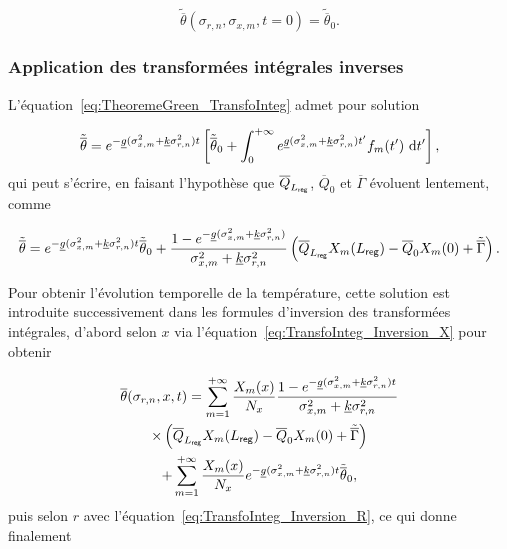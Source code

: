 \begin{equation}
	\tilde{\overline{\theta}}(\sigma_{r,n},\sigma_{x,m},t=0) = \tilde{\overline{\theta}}_0.
\end{equation}

\subsubsection{Application des transformées intégrales inverses}
L'équation~\ref{eq:TheoremeGreen_TransfoInteg} admet pour solution 

\begin{equation}
	\tilde{\overline{\theta}} = e^{-\underline{g}(\sigma_{x,m}^2+\underline{k}\sigma_{r,n}^2)t}\left[\tilde{\overline{\theta}}_0+\int_{0}^{+\infty}e^{\underline{g}(\sigma_{x,m}^2+\underline{k}\sigma_{r,n}^2)t'}f_m(t')\ \deriv t'\right],
	\label{eq:DoubleTransform_T}
\end{equation}
qui peut s'écrire, en faisant l'hypothèse que $\overline{Q}_{L_{\sf reg}}$, $\overline{Q}_{0}$ et $\overline{\Gamma}$ évoluent lentement, comme

\begin{equation}
	\tilde{\overline{\theta}} = e^{-\underline{g}(\sigma_{x,m}^2 + \underline{k}\sigma_{r,n}^2)t}\tilde{\overline{\theta}}_0 + \frac{1 - e^{-\underline{g}(\sigma_{x,m}^2 + \underline{k}\sigma_{r,n}^2)}}{\sigma_{x,m}^2 + \underline{k}\sigma_{r,n}^2}\left(\overline{Q}_{L_{\sf reg}}X_m(L_{\sf reg}) - \overline{Q}_{0}X_m(0) +\tilde{\overline{\Gamma}}\right).
	\label{eq:DoubleTransform_T_FaibleVariTempo_fm}
\end{equation}

Pour obtenir l'évolution temporelle de la température, cette solution est introduite successivement dans les formules d'inversion des transformées intégrales, d'abord selon $x$ via l'équation~\eqref{eq:TransfoInteg_Inversion_X} pour obtenir

\begin{multline}
	\overline{\theta}(\sigma_{r,n},x,t) = \sum_{m=1}^{+\infty} \frac{X_m(x)}{N_x}\frac{1-e^{-\underline{g}(\sigma_{x,m}^2+\underline{k}\sigma_{r,n}^2)t}}{\sigma_{x,m}^2+\underline{k}\sigma_{r,n}^2}\\
	\times \left(\overline{Q}_{L_{\sf reg}}X_m(L_{\sf reg}) - \overline{Q}_{0}X_m(0) +\tilde{\overline{\Gamma}}\right)\\
	+ \sum_{m=1}^{+\infty}\frac{X_m(x)}{N_x} e^{-\underline{g}(\sigma_{x,m}^2+\underline{k}\sigma_{r,n}^2)t} \tilde{\overline{\theta}}_0,
\end{multline}
puis selon $r$ avec l'équation~\eqref{eq:TransfoInteg_Inversion_R}, ce qui donne finalement

